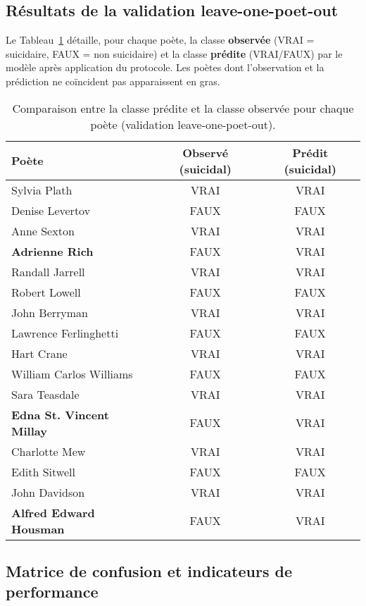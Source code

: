 \subsection{Résultats de la validation leave-one-poet-out}

Le Tableau~\ref{tab:res-by-poet} détaille, pour chaque poète, la classe \textbf{observée} (VRAI = suicidaire, FAUX = non suicidaire) et la classe \textbf{prédite} (VRAI/FAUX) par le modèle après application du protocole. Les poètes dont l’observation et la prédiction ne coïncident pas apparaissent en gras.

\begin{table}[H]
	\centering
	\caption{Comparaison entre la classe prédite et la classe observée pour chaque poète (validation leave-one-poet-out).}
	\label{tab:res-by-poet}
	\begin{tabular}{lcc}
		\toprule
		\textbf{Poète} & \textbf{Observé (suicidal)} & \textbf{Prédit (suicidal)} \\
		\midrule
		Sylvia Plath            & VRAI  & VRAI  \\
		Denise Levertov         & FAUX & FAUX \\
		Anne Sexton             & VRAI  & VRAI  \\
		\textbf{Adrienne Rich}           & FAUX & VRAI  \\
		Randall Jarrell         & VRAI  & VRAI  \\
		Robert Lowell           & FAUX & FAUX \\
		John Berryman           & VRAI  & VRAI  \\
		Lawrence Ferlinghetti   & FAUX & FAUX \\
		Hart Crane              & VRAI  & VRAI  \\
		William Carlos Williams & FAUX & FAUX \\
		Sara Teasdale           & VRAI  & VRAI  \\
		\textbf{Edna St. Vincent Millay} & FAUX & VRAI  \\
		Charlotte Mew           & VRAI  & VRAI  \\
		Edith Sitwell           & FAUX & FAUX \\
		John Davidson           & VRAI  & VRAI  \\
		\textbf{Alfred Edward Housman}  & FAUX & VRAI  \\
		\bottomrule
	\end{tabular}
\end{table}


\subsection{Matrice de confusion et indicateurs de performance}

